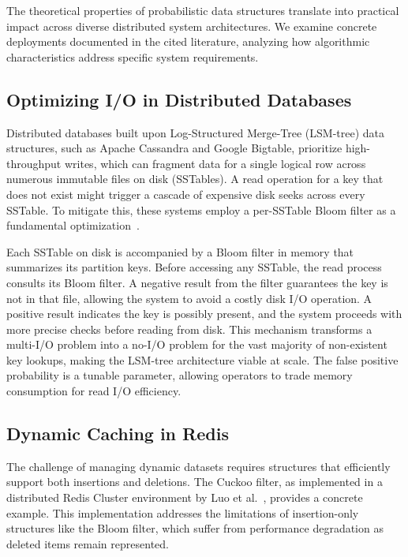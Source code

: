 The theoretical properties of probabilistic data structures translate into practical impact across diverse distributed system architectures. We examine concrete deployments documented in the cited literature, analyzing how algorithmic characteristics address specific system requirements.

\subsection{Optimizing I/O in Distributed Databases}

Distributed databases built upon Log-Structured Merge-Tree (LSM-tree) data structures, such as Apache Cassandra and Google Bigtable, prioritize high-throughput writes, which can fragment data for a single logical row across numerous immutable files on disk (SSTables). A read operation for a key that does not exist might trigger a cascade of expensive disk seeks across every SSTable. To mitigate this, these systems employ a per-SSTable Bloom filter as a fundamental optimization~\cite{bloom-filters-survey}.

Each SSTable on disk is accompanied by a Bloom filter in memory that summarizes its partition keys. Before accessing any SSTable, the read process consults its Bloom filter. A negative result from the filter guarantees the key is not in that file, allowing the system to avoid a costly disk I/O operation. A positive result indicates the key is possibly present, and the system proceeds with more precise checks before reading from disk. This mechanism transforms a multi-I/O problem into a no-I/O problem for the vast majority of non-existent key lookups, making the LSM-tree architecture viable at scale. The false positive probability is a tunable parameter, allowing operators to trade memory consumption for read I/O efficiency.

\subsection{Dynamic Caching in Redis}

The challenge of managing dynamic datasets requires structures that efficiently support both insertions and deletions. The Cuckoo filter, as implemented in a distributed Redis Cluster environment by Luo et al.~\cite{luo2018distributed}, provides a concrete example. This implementation addresses the limitations of insertion-only structures like the Bloom filter, which suffer from performance degradation as deleted items remain represented.

